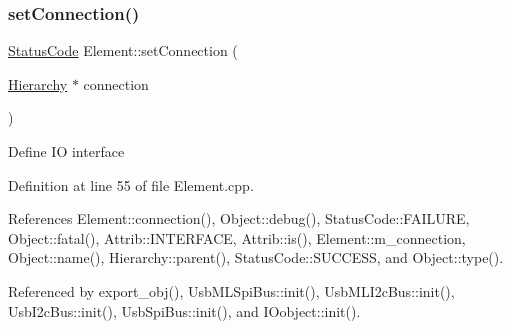 \subsubsection{\texorpdfstring{set\+Connection()}{setConnection()}}
{\footnotesize\ttfamily \hyperlink{classStatusCode}{Status\+Code} Element\+::set\+Connection (\begin{DoxyParamCaption}\item[{\hyperlink{classHierarchy}{Hierarchy} $\ast$}]{connection }\end{DoxyParamCaption})\hspace{0.3cm}{\ttfamily [inherited]}}

Define IO interface 

Definition at line 55 of file Element.\+cpp.



References Element\+::connection(), Object\+::debug(), Status\+Code\+::\+F\+A\+I\+L\+U\+RE, Object\+::fatal(), Attrib\+::\+I\+N\+T\+E\+R\+F\+A\+CE, Attrib\+::is(), Element\+::m\+\_\+connection, Object\+::name(), Hierarchy\+::parent(), Status\+Code\+::\+S\+U\+C\+C\+E\+SS, and Object\+::type().



Referenced by export\+\_\+obj(), Usb\+M\+L\+Spi\+Bus\+::init(), Usb\+M\+L\+I2c\+Bus\+::init(), Usb\+I2c\+Bus\+::init(), Usb\+Spi\+Bus\+::init(), and I\+Oobject\+::init().


